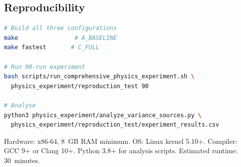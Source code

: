 \subsection{Reproducibility}

\begin{lstlisting}[language=bash]
# Build all three configurations
make                # A_BASELINE
make fastest       # C_FULL

# Run 90-run experiment
bash scripts/run_comprehensive_physics_experiment.sh \
  physics_experiment/reproduction_test 90

# Analyse
python3 physics_experiment/analyze_variance_sources.py \
  physics_experiment/reproduction_test/experiment_results.csv
\end{lstlisting}

Hardware: x86-64, 8~GB RAM minimum. OS: Linux kernel 5.10+. Compiler: GCC 9+ or
Clang 10+. Python 3.8+ for analysis scripts. Estimated runtime: 30~minutes.

